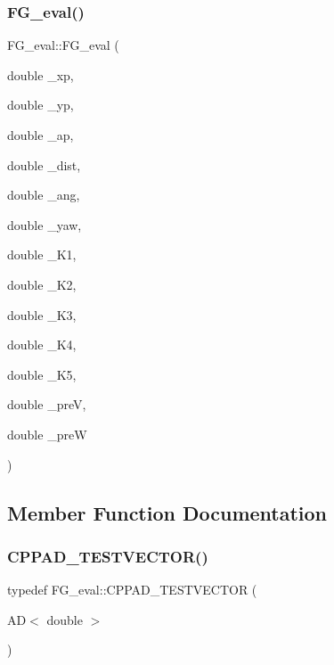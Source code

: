 \mbox{\label{classFG__eval_af179064157f6328d47b2ce44c2d30a3e}} 
\subsubsection{\texorpdfstring{F\+G\+\_\+eval()}{FG\_eval()}\hspace{0.1cm}{\footnotesize\ttfamily [2/2]}}
{\footnotesize\ttfamily F\+G\+\_\+eval\+::\+F\+G\+\_\+eval (\begin{DoxyParamCaption}\item[{double}]{\+\_\+xp,  }\item[{double}]{\+\_\+yp,  }\item[{double}]{\+\_\+ap,  }\item[{double}]{\+\_\+dist,  }\item[{double}]{\+\_\+ang,  }\item[{double}]{\+\_\+yaw,  }\item[{double}]{\+\_\+\+K1,  }\item[{double}]{\+\_\+\+K2,  }\item[{double}]{\+\_\+\+K3,  }\item[{double}]{\+\_\+\+K4,  }\item[{double}]{\+\_\+\+K5,  }\item[{double}]{\+\_\+preV,  }\item[{double}]{\+\_\+preW }\end{DoxyParamCaption})}



\subsection{Member Function Documentation}
\mbox{\label{classFG__eval_aa996df77a971dedd5d5715ef6be1258e}} 
\subsubsection{\texorpdfstring{C\+P\+P\+A\+D\+\_\+\+T\+E\+S\+T\+V\+E\+C\+T\+O\+R()}{CPPAD\_TESTVECTOR()}}
{\footnotesize\ttfamily typedef F\+G\+\_\+eval\+::\+C\+P\+P\+A\+D\+\_\+\+T\+E\+S\+T\+V\+E\+C\+T\+OR (\begin{DoxyParamCaption}\item[{AD$<$ double $>$}]{ }\end{DoxyParamCaption})}

